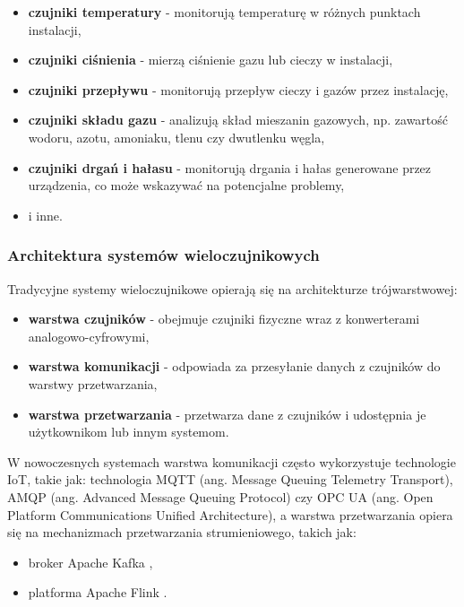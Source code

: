 \begin{itemize}
    \item \textbf{czujniki temperatury} - monitorują temperaturę w różnych punktach instalacji,
    \item \textbf{czujniki ciśnienia} - mierzą ciśnienie gazu lub cieczy w instalacji,
    \item \textbf{czujniki przepływu} - monitorują przepływ cieczy i gazów przez instalację,
    \item \textbf{czujniki składu gazu} - analizują skład mieszanin gazowych, np. zawartość wodoru, azotu, amoniaku, tlenu czy dwutlenku węgla,
    \item \textbf{czujniki drgań i hałasu} - monitorują drgania i hałas generowane przez urządzenia, co może wskazywać na potencjalne problemy,
    \item i inne.
\end{itemize}

\subsubsection{Architektura systemów wieloczujnikowych}
\label{subsubsec:architektura_systemow}

Tradycyjne systemy wieloczujnikowe opierają się na architekturze trójwarstwowej:

\begin{itemize}
    \item \textbf{warstwa czujników} - obejmuje czujniki fizyczne wraz z konwerterami analogowo-cyfrowymi,
    \item \textbf{warstwa komunikacji} - odpowiada za przesyłanie danych z czujników do warstwy przetwarzania,
    \item \textbf{warstwa przetwarzania} - przetwarza dane z czujników i udostępnia je użytkownikom lub innym systemom.
\end{itemize}

W nowoczesnych systemach warstwa komunikacji często wykorzystuje technologie IoT, takie jak: technologia MQTT (ang. Message Queuing Telemetry Transport), AMQP (ang. Advanced Message Queuing Protocol) czy OPC UA (ang. Open Platform Communications Unified Architecture),
a warstwa przetwarzania opiera się na mechanizmach przetwarzania strumieniowego, takich jak:

\begin{itemize}
    \item broker Apache Kafka \cite{spark_documentation},
    \item platforma Apache Flink \cite{flink}.
\end{itemize}

